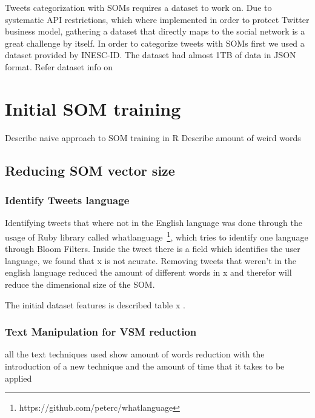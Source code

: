 \label{ch:clustering_tweets}

Tweets categorization with \ac{SOMs} requires a dataset to work on. Due to systematic API restrictions, which where implemented in order to protect Twitter business model, gathering a dataset that directly maps to the social network is a great challenge by itself. 
In order to categorize tweets with \ac{SOMs} first we used a dataset provided by INESC-ID. The dataset had almost 1TB of data in \ac{JSON} format.
{\color{red} Refer dataset info on }

\section{Initial SOM training}
\label{sec:ininitial_som_trainning}

{\color{red} Describe naive approach to SOM training in R }
{\color{red} Describe amount of weird words }

\subsection{Reducing SOM vector size}
\label{sub:reducing_som_vector_size}

\subsubsection{Identify Tweets language}
\label{ssub:identify_tweets_lang}

Identifying tweets that where not in the English language was done through the usage of Ruby library called whatlanguage~\footnote{https://github.com/peterc/whatlanguage}, which tries to identify one language through Bloom Filters. Inside the tweet there is a field which identifies the user language, we found that x is not acurate. Removing tweets that weren't in the english language reduced the amount of different words in x and therefor will reduce the dimensional size of the \ac{SOM}.

{\color{red}  The initial dataset features is described table x}
 .
\subsubsection{Text Manipulation for VSM reduction}
\label{ssub:Text Manipulation for SVM reduction}
{\color{red} all the text techniques used }
{\color{red} show amount of words reduction with the introduction of a new technique and the amount of time that it takes to be applied }

